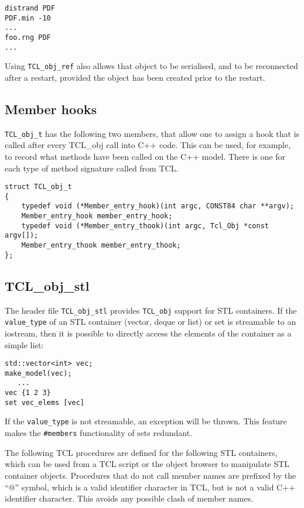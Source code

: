 \begin{verbatim}
distrand PDF
PDF.min -10
...
foo.rng PDF
...
\end{verbatim}

Using \verb+TCL_obj_ref+ also allows that object to be serialised, and
to be reconnected after a restart, provided the object has been
created prior to the restart.

\subsection{Member hooks}\label{Member hooks}

\verb+TCL_obj_t+ has the following two members, that allow one to
assign a hook that is called after every TCL\_obj call into C++
code. This can be used, for example, to record what methods have been
called on the C++ model. There is one for each type of method
signature called from TCL.

\begin{verbatim}
struct TCL_obj_t
{
    typedef void (*Member_entry_hook)(int argc, CONST84 char **argv);
    Member_entry_hook member_entry_hook;
    typedef void (*Member_entry_thook)(int argc, Tcl_Obj *const argv[]);
    Member_entry_thook member_entry_thook;
};
\end{verbatim}

\subsection{TCL\_obj\_stl}\label{TCL_obj_stl}

The header file \verb+TCL_obj_stl+ provides \verb+TCL_obj+ support for
STL containers. If the \verb+value_type+ of an STL container (vector, deque
or list) or set is streamable to an iostream, then it is possible to
directly access the elements of the container as a simple list:

\begin{verbatim}
std::vector<int> vec;
make_model(vec);
   ...
vec {1 2 3}
set vec_elems [vec]
\end{verbatim}
If the \verb+value_type+ is not streamable, an exception will be thrown. This
feature makes the \verb+#members+ functionality of sets redundant.

The following TCL procedures are defined for the
following STL containers, which can be used from a TCL script or the
object browser to manipulate STL container objects. Procedures that do
not call member names are prefixed by the ``@'' symbol, which is a
valid identifier character in TCL, but is not a valid C++ identifier
character. This avoids any possible clash of member names.

